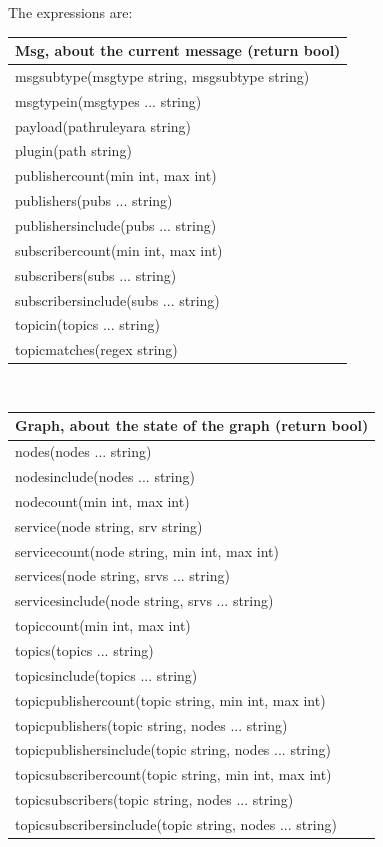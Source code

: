 \documentclass[a4paper]{article}
\begin{document}
The expressions are:
\\

\begin{tabular}{l}
\\
 Msg, about the current message (return bool) \\
\hline
	msgsubtype(msgtype string, msgsubtype string)\\
	msgtypein(msgtypes  ... string)\\
	payload(pathruleyara string)\\
	plugin(path string)\\
	publishercount(min int, max int)\\
	publishers(pubs  ... string)\\
	publishersinclude(pubs ... string)\\
	subscribercount(min int, max int)	\\
	subscribers(subs  ... string)\\
	subscribersinclude(subs ... string)\\
	topicin(topics ... string)\\
	topicmatches(regex string)\\
\end{tabular}
\\

\begin{tabular}{l}
\\
 Graph, about the state of the graph (return bool)\\
\hline
	nodes(nodes  ... string)\\
	nodesinclude(nodes  ... string)\\
	nodecount(min int, max int)\\
	service(node string, srv string)\\
	servicecount(node string, min int, max int)\\
	services(node string, srvs ... string)\\
	servicesinclude(node string, srvs ... string)\\
	topiccount(min int, max int)\\
	topics(topics ... string)\\
	topicsinclude(topics ... string)\\
	topicpublishercount(topic string, min int, max int)\\
	topicpublishers(topic string, nodes ... string)\\
	topicpublishersinclude(topic string, nodes ... string)\\
	topicsubscribercount(topic string, min int, max int)\\
	topicsubscribers(topic string, nodes ... string)\\
	topicsubscribersinclude(topic string, nodes ... string)\\
\end{tabular}
\\
\end{document}
